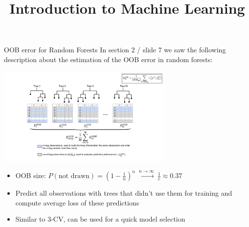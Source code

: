 

\newcommand{\learninggoals}{
  \item \textcolor{blue}{XXXXXXXXXXXXXXXX}
  \item \textcolor{blue}{XXXXXXXXXXXXXXXX}
}



\title{Introduction to Machine Learning}
\date{}

\setbeamertemplate{frametitle}{\expandafter\uppercase\expandafter\insertframetitle}






\sloppy



\begin{vbframe}{OOB error for Random Forests}
In section 2 / slide 7 we saw the following description about the estimation of the OOB error in random forests:
\begin{center}
\includegraphics[width=0.65\textwidth]{figure_man/rF_oob_error_new.pdf}
\end{center}

\begin{itemize}
  \item OOB size: $P(\text{not drawn}) = \left(1 - \frac{1}{n}\right)^n \ \stackrel{n \to \infty}{\longrightarrow} \ \frac{1}{e} \approx 0.37$
  \item Predict all observations with trees that didn't use them for training and compute average loss of these predictions
  \item Similar to 3-CV, can be used for a quick model selection
\end{itemize}


\end{vbframe}


